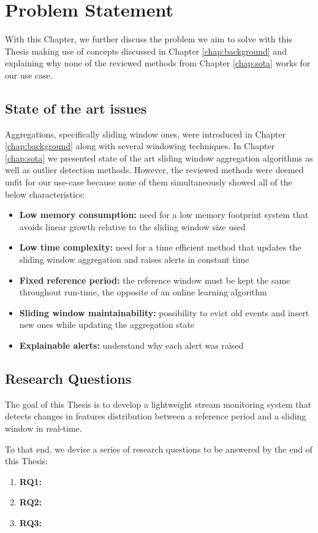 \chapter{Problem Statement} \label{chap:statement} \minitoc

With this Chapter, we further discuss the problem we aim to solve with this Thesis making use of concepts discussed in Chapter \ref{chap:background} and explaining why none of the reviewed methods from Chapter \ref{chap:sota} works for our use case.

\section{State of the art issues}
Aggregations, specifically sliding window ones, were introduced in Chapter \ref{chap:background} along with several windowing techniques. In Chapter \ref{chap:sota} we presented state of the art sliding window aggregation algorithms as well as outlier detection methods. However, the reviewed methods were deemed unfit for our use-case because none of them simultaneously showed all of the below characteristics:

\begin{itemize}
    \item \textbf{Low memory consumption:} need for a low memory footprint system that avoids linear growth relative to the sliding window size used
    
    \item \textbf{Low time complexity:} need for a time efficient method that updates the sliding window aggregation and raises alerts in constant time
    
    \item \textbf{Fixed reference period:} the reference window must be kept the same throughout run-time, the opposite of an online learning algorithm
    
    \item \textbf{Sliding window maintainability:} possibility to evict old events and insert new ones while updating the aggregation state
    
    \item \textbf{Explainable alerts:} understand why each alert was raised
\end{itemize}


\section{Research Questions}
The goal of this Thesis is to develop a lightweight stream monitoring system that detects changes in features distribution between a reference period and a sliding window in real-time.

To that end, we devise a series of research questions to be answered by the end of this Thesis:

\begin{enumerate}
    \item \textbf{RQ1:}
    \item \textbf{RQ2:}
    \item \textbf{RQ3:}
\end{enumerate}
